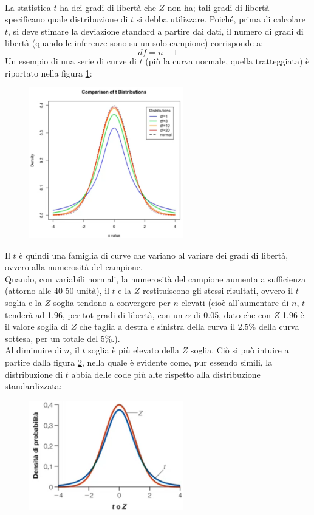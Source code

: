 \documentclass[10pt, draft]{book}
\begin{document}
\\
La statistica $t$ ha dei gradi di libertà che $Z$ non ha; tali gradi di libertà specificano quale distribuzione di $t$ si debba utilizzare. Poiché, prima di calcolare $t$, si deve stimare la deviazione standard a partire dai dati, il numero di gradi di libertà (quando le inferenze sono su un solo campione) corrisponde a:
\begin{equation}
    df = n-1
\end{equation}
Un esempio di una serie di curve di $t$ (più la curva normale, quella tratteggiata) è riportato nella figura \ref{figdistribuzionit}:
\begin{figure}[H]\label{figdistribuzionit}
    \centering
    \includegraphics[width=0.6\textwidth]{figdistribuzionit}
    \caption{\small{}}
    \end{figure}
Il $t$ è quindi una famiglia di curve che variano al variare dei gradi di libertà, ovvero alla numerosità del campione.
\\
Quando, con variabili normali, la numerosità del campione aumenta a sufficienza (attorno alle 40-50 unità), il $t$ e la $Z$ restituiscono gli stessi risultati, ovvero il $t$ soglia e la $Z$ soglia tendono a convergere per $n$ elevati (cioè all'aumentare di $n$, $t$ tenderà ad 1.96, per tot gradi di libertà, con un $\alpha$ di 0.05, dato che con $Z$ 1.96 è il valore soglia di $Z$ che taglia a destra e sinistra della curva il 2.5\% della curva sottesa, per un totale del 5\%.).
\\
Al diminuire di $n$, il $t$ soglia è più elevato della $Z$ soglia. Ciò si può intuire a partire dalla figura \ref{fig11.1-1}, nella quale è evidente come, pur essendo simili, la distribuzione di $t$ abbia delle code più alte rispetto alla distribuzione standardizzata:
\begin{figure}[H]\label{fig11.1-1}
    \centering
    \includegraphics[width=0.6\textwidth]{fig11.1-1}
    \caption{\small{}}
    \end{figure}
\end{document}
